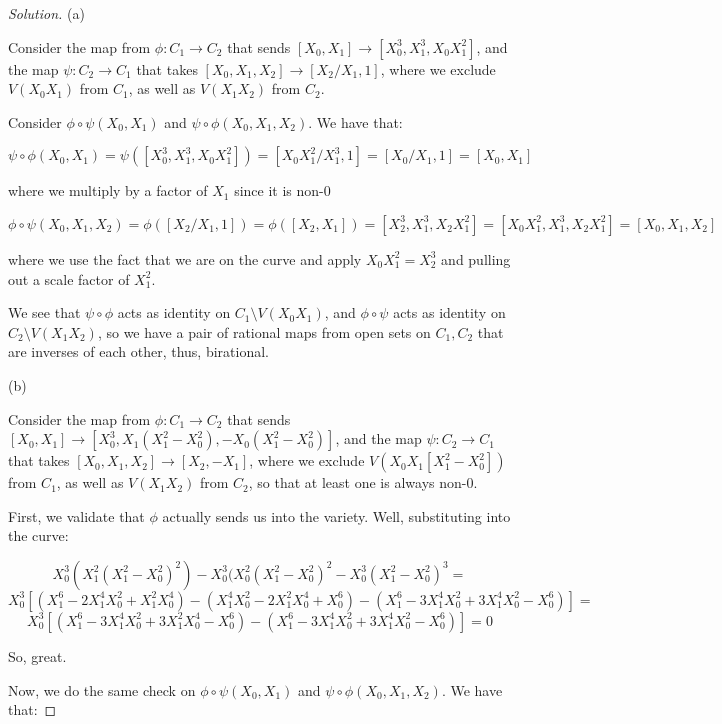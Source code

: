 \documentclass[10pt]{article}
\begin{document}
\begin{proof}[Solution]

(a)

Consider the map from $\phi: C_1 \to C_2$ that sends $[X_0,X_1] \to [X_0^3, X_1^3, X_0X_1^2]$, and the map $\psi: C_2 \to C_1$ that takes $[X_0,X_1,X_2] \to [X_2/X_1, 1]$, where we exclude $V(X_0X_1)$ from $C_1$, as well as $V(X_1X_2)$ from $C_2$. 

Consider $\phi \circ \psi(X_0,X_1)$ and $\psi \circ \phi(X_0,X_1, X_2)$. We have that:

$$\psi \circ \phi(X_0,X_1) = \psi([X_0^3, X_1^3, X_0X_1^2]) = [X_0X_1^2/X_1^3,1] = [X_0/X_1,1] = [X_0,X_1]$$

where we multiply by a factor of $X_1$ since it is non-0

$$\phi \circ \psi(X_0,X_1, X_2) = \phi([X_2/X_1, 1]) = \phi([X_2,X_1]) = [X_2^3, X_1^3, X_2X_1^2] = [X_0X_1^2, X_1^3, X_2X_1^2] = [X_0,X_1,X_2]$$

where we use the fact that we are on the curve and apply $X_0X_1^2 = X_2^3$ and pulling out a scale factor of $X_1^2$.

We see that $\psi \circ \phi$ acts as identity on $C_1 \setminus V(X_0X_1)$, and $\phi \circ \psi$ acts as identity on $C_2 \setminus V(X_1X_2)$, so we have a pair of rational maps from open sets on $C_1, C_2$ that are inverses of each other, thus, birational.

(b)

Consider the map from $\phi: C_1 \to C_2$ that sends $[X_0,X_1] \to [X_0^3, X_1(X_1^2 - X_0^2), -X_0(X_1^2 - X_0^2)]$, and the map $\psi: C_2 \to C_1$ that takes $[X_0,X_1,X_2] \to [X_2,-X_1]$, where we exclude $V(X_0X_1[X_1^2 - X_0^2])$ from $C_1$, as well as $V(X_1X_2)$ from $C_2$, so that at least one is always non-0.

First, we validate that $\phi$ actually sends us into the variety. Well, substituting into the curve:

$$ X_0^3(X_1^2(X_1^2 - X_0^2)^2) - X_0^3(X_0^2(X_1^2 - X_0^2)^2   - X_0^3(X_1^2 - X_0^2)^3 = $$
$$ X_0^3[ (X_1^6 - 2X_1^4X_0^2 + X_1^2X_0^4) - (X_1^4X_0^2 - 2X_1^2X_0^4 + X_0^6)   - (X_1^6 - 3X_1^4X_0^2 + 3X_1^4 X_0^2 - X_0^6)] = $$
$$ X_0^3[ (X_1^6 - 3X_1^4X_0^2 + 3X_1^2X_0^4 - X_0^6) -  (X_1^6 - 3X_1^4X_0^2 + 3X_1^4 X_0^2 - X_0^6)] = 0$$

So, great. 

Now, we do the same check on $\phi \circ \psi(X_0,X_1)$ and $\psi \circ \phi(X_0,X_1, X_2)$. We have that:


\end{proof}
\end{document}

